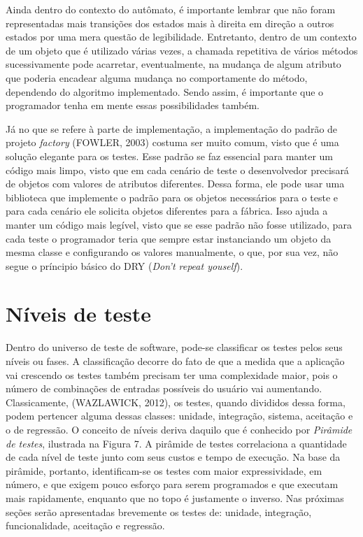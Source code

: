 \documentclass[
    12pt,       %
    openright,      %
    twoside,      %
    a4paper,      %
    english,      %
    french,       %
    spanish,      %
    brazil,       %
    ]{abntex2}
\begin{document}
          Ainda dentro do contexto do autômato, é importante lembrar que não foram representadas
          mais transições dos estados mais à direita em direção a outros estados por uma mera
          questão de legibilidade. Entretanto, dentro de um contexto de um objeto que é utilizado
          várias vezes, a chamada repetitiva de vários métodos sucessivamente pode acarretar,
          eventualmente, na mudança de algum atributo que poderia encadear alguma mudança no
          comportamente do método, dependendo do algoritmo implementado. Sendo assim, é importante
          que o programador tenha em mente essas possibilidades também.

          Já no que se refere à parte de implementação, a implementação do padrão de projeto
          \textit{factory} (FOWLER, 2003) costuma ser muito comum, visto que é uma solução elegante
          para os testes. Esse padrão se faz essencial para manter um código mais limpo,
          visto que em cada cenário de teste o desenvolvedor precisará de objetos com valores de
          atributos diferentes. Dessa forma, ele pode usar uma biblioteca que implemente
          o padrão para os objetos necessários para o teste e para cada cenário ele solicita
          objetos diferentes para a fábrica. Isso ajuda a manter um código mais legível, visto
          que se esse padrão não fosse utilizado, para cada teste o programador teria que sempre
          estar instanciando um objeto da mesma classe e configurando os valores manualmente,
          o que, por sua vez, não segue o príncipio básico do DRY (\textit{Don't repeat youself}).

      \section{Níveis de teste}
          Dentro do universo de teste de software, pode-se classificar os testes pelos seus
          níveis ou fases. A classificação decorre do fato de que a medida que a aplicação
          vai crescendo os testes também precisam ter uma complexidade maior, pois o número
          de combinações de entradas possíveis do usuário vai aumentando. Classicamente,
          (WAZLAWICK, 2012), os testes, quando divididos dessa forma, podem pertencer alguma
          dessas classes: unidade, integração, sistema, aceitação e o de regressão. O
          conceito de níveis deriva daquilo que é conhecido por \textit{Pirâmide de testes},
          ilustrada na Figura 7. A pirâmide de testes correlaciona a quantidade de cada nível
          de teste junto com seus custos e tempo de execução. Na base da pirâmide, portanto,
          identificam-se os testes com maior expressividade, em número, e que exigem pouco
          esforço para serem programados e que executam mais rapidamente, enquanto que no topo
          é justamente o inverso. Nas próximas seções serão apresentadas brevemente os testes de:
          unidade, integração, funcionalidade, aceitação e regressão.
\end{document}
